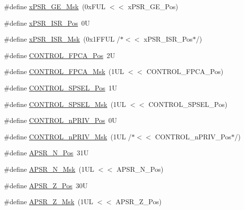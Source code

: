 \begin{DoxyCompactItemize}
\item 
\#define \hyperlink{group___c_m_s_i_s___c_o_r_e_ga967634e605d013e9b07002eca31f7903}{x\+P\+S\+R\+\_\+\+G\+E\+\_\+\+Msk}~(0x\+F\+U\+L $<$$<$ x\+P\+S\+R\+\_\+\+G\+E\+\_\+\+Pos)
\item 
\#define \hyperlink{group___c_m_s_i_s___c_o_r_e_ga21bff245fb1aef9683f693d9d7bb2233}{x\+P\+S\+R\+\_\+\+I\+S\+R\+\_\+\+Pos}~0U
\item 
\#define \hyperlink{group___c_m_s_i_s___c_o_r_e_gadf8eed87e0081dfe1ef1c78a0ea91afd}{x\+P\+S\+R\+\_\+\+I\+S\+R\+\_\+\+Msk}~(0x1\+F\+F\+U\+L /$\ast$$<$$<$ x\+P\+S\+R\+\_\+\+I\+S\+R\+\_\+\+Pos$\ast$/)
\item 
\#define \hyperlink{group___c_m_s_i_s___c_o_r_e_gac7018b59b07134c5363b33eb94918a58}{C\+O\+N\+T\+R\+O\+L\+\_\+\+F\+P\+C\+A\+\_\+\+Pos}~2U
\item 
\#define \hyperlink{group___c_m_s_i_s___c_o_r_e_gad20bb0212b2e1864f24af38d93587c79}{C\+O\+N\+T\+R\+O\+L\+\_\+\+F\+P\+C\+A\+\_\+\+Msk}~(1\+U\+L $<$$<$ C\+O\+N\+T\+R\+O\+L\+\_\+\+F\+P\+C\+A\+\_\+\+Pos)
\item 
\#define \hyperlink{group___c_m_s_i_s___c_o_r_e_ga07eafc53e609895342c6a530e9d01310}{C\+O\+N\+T\+R\+O\+L\+\_\+\+S\+P\+S\+E\+L\+\_\+\+Pos}~1U
\item 
\#define \hyperlink{group___c_m_s_i_s___c_o_r_e_ga70b29840969b06909da21369b0b05b53}{C\+O\+N\+T\+R\+O\+L\+\_\+\+S\+P\+S\+E\+L\+\_\+\+Msk}~(1\+U\+L $<$$<$ C\+O\+N\+T\+R\+O\+L\+\_\+\+S\+P\+S\+E\+L\+\_\+\+Pos)
\item 
\#define \hyperlink{group___c_m_s_i_s___c_o_r_e_ga51b95bc03ec0d815b459bde0b14a5908}{C\+O\+N\+T\+R\+O\+L\+\_\+n\+P\+R\+I\+V\+\_\+\+Pos}~0U
\item 
\#define \hyperlink{group___c_m_s_i_s___c_o_r_e_gaef3b20d77acb213338f89ce5e7bc36b0}{C\+O\+N\+T\+R\+O\+L\+\_\+n\+P\+R\+I\+V\+\_\+\+Msk}~(1\+U\+L /$\ast$$<$$<$ C\+O\+N\+T\+R\+O\+L\+\_\+n\+P\+R\+I\+V\+\_\+\+Pos$\ast$/)
\item 
\#define \hyperlink{group___c_m_s_i_s___c_o_r_e_gac469528d210043c7bd3f12f0e6824766}{A\+P\+S\+R\+\_\+\+N\+\_\+\+Pos}~31U
\item 
\#define \hyperlink{group___c_m_s_i_s___c_o_r_e_gadbc2cf55a026f661b53fadfcf822cef1}{A\+P\+S\+R\+\_\+\+N\+\_\+\+Msk}~(1\+U\+L $<$$<$ A\+P\+S\+R\+\_\+\+N\+\_\+\+Pos)
\item 
\#define \hyperlink{group___c_m_s_i_s___c_o_r_e_ga3661286d108b1aca308d7445685eae3a}{A\+P\+S\+R\+\_\+\+Z\+\_\+\+Pos}~30U
\item 
\#define \hyperlink{group___c_m_s_i_s___c_o_r_e_ga1deb4d1aa72bb83d1f79329406f15711}{A\+P\+S\+R\+\_\+\+Z\+\_\+\+Msk}~(1\+U\+L $<$$<$ A\+P\+S\+R\+\_\+\+Z\+\_\+\+Pos)
$$
\end{DoxyCompactItemize}
